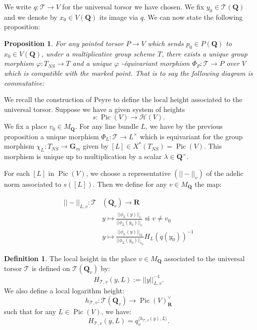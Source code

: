 \documentclass{proc-l}
\newcommand{\R}{\mathbf{R}}
\newcommand{\Q}{\mathbf{Q}}
\newcommand{\G}{\mathbf{G}}
\DeclareMathOperator{\Pic}{Pic}
\newcommand{\stackT}{\mathcal{T}}
\newtheorem{prop}[theorem]{Proposition}
\theoremstyle{definition}
\newtheorem{definition}[theorem]{Definition}
\theoremstyle{remark}
\numberwithin{equation}{section}
\begin{document}
We write $q : \stackT \rightarrow V$ for the universal torsor we have chosen. We fix $y_0 \in \stackT(\Q)$ and we denote by $x_0 \in V(\Q)$ its image via $q$. We can now state the following proposition:

\begin{prop}
    For any pointed torsor $P \rightarrow V$ which sends $p_0 \in P(\Q)$ to $x_0 \in V(\Q)$, under a multiplicative group scheme $T$, there exists a unique group morphism $\varphi : T_{N S} \rightarrow T$ and a unique $\varphi$ -équivariant morphism $\Phi_P : \stackT \rightarrow P$ over $V$ which is compatible with the marked point. That is to say the following diagram is commutative:
    \begin{center}
    \end{center}
\end{prop}






We recall the construction of Peyre \cite[construction 4.27]{Peyre_beyond_height} to define the local height associated to the universal torsor. Suppose we have a given system of heights $$s : \Pic(V) \rightarrow \mathcal{H}(V) .$$We fix a place $v_0 \in M_{\Q}$. For any line bundle $L$, we have by the previous proposition a unique morphism $\Phi_L : \stackT \rightarrow L^{\times}$ which is equivariant for the group morphism $\chi_L : T_{N S} \rightarrow \G_m$ given by $[L] \in X^*(T_{NS}) = \Pic(V)$. This morphism is unique up to multiplication by a scalar $\lambda \in \Q^{\times}$.

For each $[L]$ in $\Pic(V)$, we choose a representative $(||-||_v)$ of the adelic norm associated to $s([L])$. Then we define for any $v \in M_{\Q}$ the map:

\begin{align*}
    ||-||_{L,v} : \stackT&(\Q_v) \rightarrow \R \\
    &y \longmapsto \frac{||\phi_L(y)||_v}{||\phi_L(y_0)||_v} \text{  si } v \neq v_0 \\
    &y \longmapsto \frac{||\phi_L(y)||_{v_0}}{||\phi_L(y_0)||_{v_0}} H_L(q(y_0))^{-1}
\end{align*}

\begin{definition}\label{definition_local_height}
    The local height in the place $v \in M_{\Q}$ associated to the universal torsor $\stackT$ is defined on $\stackT(\Q_v)$ by:
        $$H_{\stackT,v}(y,L) := ||y||_{L,v}^{-1} .$$
    We also define a local logarithm height: $$h_{\stackT,v} : \stackT(\Q_v) \rightarrow \Pic(V)^{\vee}_{\R} $$such that for any $L \in \Pic(V)$, we have:
    $$ H_{\stackT,v}(y,L) = q_v^{\langle h_{\stackT,v}(y) , L \rangle } .$$
\end{definition}
\end{document}
